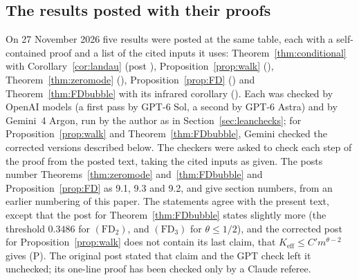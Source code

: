 \subsection{The results posted with their proofs}\label{sec:resultchecks}
\begin{sloppypar}
On 27 November 2026 five results were posted at the same table, each with a self-contained proof and a list of the cited inputs it uses: Theorem~\ref{thm:conditional} with Corollary~\ref{cor:landau} (post ), Proposition~\ref{prop:walk} (), Theorem~\ref{thm:zeromode} (), Proposition~\ref{prop:FD} () and Theorem~\ref{thm:FDbubble} with its infrared corollary (). Each was checked by OpenAI models (a first pass by GPT-6 Sol, a second by GPT-6 Astra) and by Gemini~4 Argon, run by the author as in Section~\ref{sec:leanchecks}; for Proposition~\ref{prop:walk} and Theorem~\ref{thm:FDbubble}, Gemini checked the corrected versions described below. The checkers were asked to check each step of the proof from the posted text, taking the cited inputs as given. The posts number Theorems~\ref{thm:zeromode} and~\ref{thm:FDbubble} and Proposition~\ref{prop:FD} as 9.1, 9.3 and 9.2, and give section numbers, from an earlier numbering of this paper. The statements agree with the present text, except that the post for Theorem~\ref{thm:FDbubble} states slightly more (the threshold $0.3486$ for $(\mathrm{FD}_2)$, and $(\mathrm{FD}_3)$ for $\theta\le1/2$), and the corrected post for Proposition~\ref{prop:walk} does not contain its last claim, that $K_{\mathrm{eff}}\le C'm^{\theta-2}$ gives (P). The original post stated that claim and the GPT check left it unchecked; its one-line proof has been checked only by a Claude referee.
\end{sloppypar}
